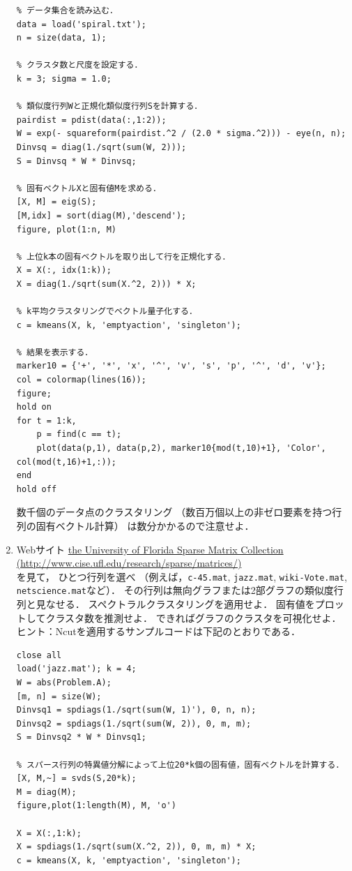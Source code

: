 \begin{enumerate}
\begin{lstlisting}
% データ集合を読み込む．
data = load('spiral.txt');
n = size(data, 1);

% クラスタ数と尺度を設定する．
k = 3; sigma = 1.0;

% 類似度行列Wと正規化類似度行列Sを計算する．
pairdist = pdist(data(:,1:2));
W = exp(- squareform(pairdist.^2 / (2.0 * sigma.^2))) - eye(n, n);
Dinvsq = diag(1./sqrt(sum(W, 2)));
S = Dinvsq * W * Dinvsq;

% 固有ベクトルXと固有値Mを求める．
[X, M] = eig(S);
[M,idx] = sort(diag(M),'descend');
figure, plot(1:n, M)

% 上位k本の固有ベクトルを取り出して行を正規化する．
X = X(:, idx(1:k));
X = diag(1./sqrt(sum(X.^2, 2))) * X;

% k平均クラスタリングでベクトル量子化する．
c = kmeans(X, k, 'emptyaction', 'singleton');

% 結果を表示する．
marker10 = {'+', '*', 'x', '^', 'v', 's', 'p', '^', 'd', 'v'};
col = colormap(lines(16));
figure;
hold on
for t = 1:k,
    p = find(c == t);
    plot(data(p,1), data(p,2), marker10{mod(t,10)+1}, 'Color', col(mod(t,16)+1,:));
end
hold off
\end{lstlisting}
数千個のデータ点のクラスタリング
（数百万個以上の非ゼロ要素を持つ行列の固有ベクトル計算）
は数分かかるので注意せよ．


\item\yeeks
Webサイト
\href{http://www.cise.ufl.edu/research/sparse/matrices/}{the University of Florida Sparse Matrix Collection\\ (http://www.cise.ufl.edu/research/sparse/matrices/)}\\
を見て，
ひとつ行列を選べ
（例えば，{\tt c-45.mat}, {\tt jazz.mat}, {\tt wiki-Vote.mat}, {\tt netscience.mat}など）．
その行列は無向グラフまたは2部グラフの類似度行列と見なせる．
スペクトラルクラスタリングを適用せよ．
固有値をプロットしてクラスタ数を推測せよ．
できればグラフのクラスタを可視化せよ．\\
ヒント：Ncutを適用するサンプルコードは下記のとおりである．
\begin{lstlisting}
close all
load('jazz.mat'); k = 4;
W = abs(Problem.A);
[m, n] = size(W);
Dinvsq1 = spdiags(1./sqrt(sum(W, 1)'), 0, n, n);
Dinvsq2 = spdiags(1./sqrt(sum(W, 2)), 0, m, m);
S = Dinvsq2 * W * Dinvsq1;

% スパース行列の特異値分解によって上位20*k個の固有値，固有ベクトルを計算する．
[X, M,~] = svds(S,20*k);
M = diag(M);
figure,plot(1:length(M), M, 'o')

X = X(:,1:k);
X = spdiags(1./sqrt(sum(X.^2, 2)), 0, m, m) * X;
c = kmeans(X, k, 'emptyaction', 'singleton');
\end{lstlisting}
\end{enumerate}





{\footnotesize

}



